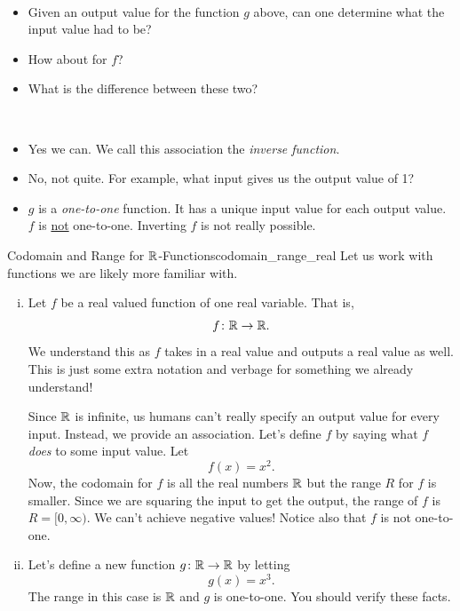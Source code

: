     \begin{question}~
    \begin{itemize}
        \item Given an output value for the function $g$ above, can one determine what the input value had to be?
        \item How about for $f$?
        \item What is the difference between these two?
    \end{itemize}
    \end{question}

    \begin{answer}~
        \begin{itemize}
            \item Yes we can. We call this association the \emph{inverse function}.
            \item No, not quite.  For example, what input gives us the output value of 1?
            \item $g$ is a \emph{one-to-one} function. It has a unique input value for each output value. $f$ is \underline{not} one-to-one.  Inverting $f$ is not really possible.
        \end{itemize}
    \end{answer}

    \begin{ex}{Codomain and Range for $\mathbb{R}$-Functions}{codomain_range_real}
        Let us work with functions we are likely more familiar with.
        \begin{enumerate}[(i)]
            \item Let $f$ be a real valued function of one real variable. That is,
            \[
            f\colon \mathbb{R} \to \mathbb{R}.
            \]
            We understand this as $f$ takes in a real value and outputs a real value as well.  This is just some extra notation and verbage for something we already understand!

            Since $\mathbb{R}$ is infinite, us humans can't really specify an output value for every input.  Instead, we provide an association.  Let's define $f$ by saying what $f$ \emph{does} to some input value.  Let
            \[
            f(x)=x^2.
            \]
            Now, the codomain for $f$ is all the real numbers $\mathbb{R}$ but the range $R$ for $f$ is smaller.  Since we are squaring the input to get the output, the range of $f$ is $R=[0,\infty)$.  We can't achieve negative values! Notice also that $f$ is not one-to-one.

            \item Let's define a new function $g\colon \mathbb{R} \to \mathbb{R}$ by letting
            \[
            g(x)=x^3.
            \]
            The range in this case is $\mathbb{R}$ and $g$ is one-to-one. You should verify these facts.
        \end{enumerate}
    \end{ex}


